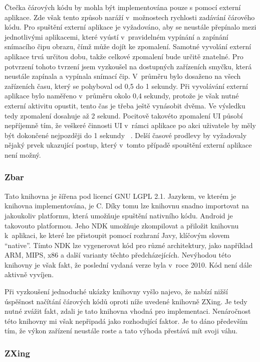 \documentclass[thesis=B,czech]{FITthesis}[2013/10/20]
\begin{document}
Čtečka čárových kódu by mohla být implementována pouze s pomocí externí aplikace. Zde však tento způsob naráží v~možnostech rychlosti zadávání čárového kódu. Pro spuštění externí aplikace je vyžadováno, aby se neustále přepínalo mezi jednotlivými aplikacemi, které vyústí v~pravidelném vypínání a zapínání snímacího čipu obrazu, čímž může dojít ke zpomalení. Samotné vyvolání externí aplikace trvá určitou dobu, takže celkové zpomalení bude určitě znatelné. Pro potvrzení tohoto tvrzení jsem vyzkoušel na dostupných zařízeních smyčku, která neustále zapínala a vypínala snímací čip. V~průměru bylo dosaženo na všech zařízeních času, který se pohyboval od 0,5 do 1 sekundy. Při vyvolávání externí aplikace bylo naměřeno v~průměru okolo 0,4 sekundy, protože je však nutné externí aktivitu opustit, tento čas je třeba ještě vynásobit dvěma. Ve výsledku tedy zpomalení dosahuje až 2 sekund. Pocitově takovéto zpomalení UI působí nepříjemně tím, že veškeré činnosti UI v~rámci aplikace po akci uživatele by měly být dokončené nejpozději do 1 sekundy ~\cite{ui_maxlag}. Delší časové prodlevy by vyžadovaly nějaký prvek ukazující postup, který v~tomto případě spouštění externí aplikace není možný.

\subsubsection{Zbar ~\cite{zbar}}

Tato knihovna je šířena pod licencí GNU LGPL 2.1. Jazykem, ve kterém je knihovna implementována, je C. Díky tomu lze knihovnu snadno importovat na jakoukoliv platformu, která umožňuje spuštění nativního kódu. Android je takovouto platformou. Jeho NDK umožňuje zkompilovat a přiložit knihovnu k~aplikaci, ke které lze přistoupit pomocí rozhraní Javy, klíčovým slovem ``native''. Tímto NDK lze vygenerovat kód pro různé architektury, jako například ARM, MIPS, x86 a další varianty těchto předcházejících. Nevýhodou této knihovny je však fakt, že poslední vydaná verze byla v~roce 2010. Kód není dále aktivně vyvíjen.

Při vyzkoušení jednoduché ukázky knihovny vyšlo najevo, že nabízí nižší úspěšnost načítání čárových kódů oproti níže uvedené knihovně ZXing. Je tedy nutné zvážit fakt, zdali je tato knihovna vhodná pro implementaci. Nenáročnost této knihovny mi však nepřipadá jako rozhodující faktor. Je to dáno především tím, že výkon zařízení neustále roste a tato výhoda přestává mít svoji váhu.

\subsubsection{ZXing ~\cite{zxing}}
\end{document}
